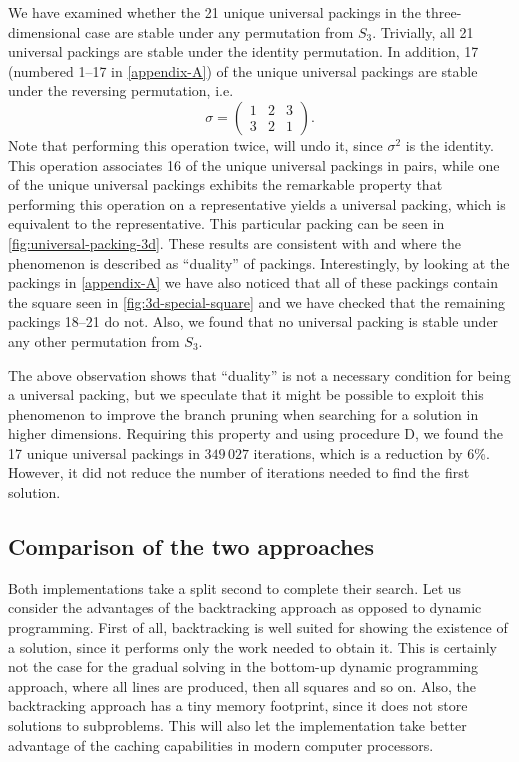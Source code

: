 \begin{observation}
We have examined whether the 21 unique universal packings in the three-dimensional case are stable under any permutation from $S_3$. Trivially, all 21 universal packings are stable under the identity permutation. In addition, 17 (numbered 1--17 in \cref{appendix-A}) of the unique universal packings are stable under the reversing permutation, i.e.
\[
\sigma =
\begin{pmatrix}
  1 & 2 & 3 \\
  3 & 2 & 1
\end{pmatrix}.
\]
Note that performing this operation twice, will undo it, since $\sigma^2$ is the identity. This operation associates 16 of the unique universal packings in pairs, while one of the unique universal packings exhibits the remarkable property that performing this operation on a representative yields a universal packing, which is equivalent to the representative. This particular packing can be seen in \cref{fig:universal-packing-3d}. These results are consistent with \cite[p. 5]{Spiridonov_2003} and \cite[p. 914]{berlekamp_conway_guy_2004} where the phenomenon is described as ``duality'' of packings. Interestingly, by looking at the packings in \cref{appendix-A} we have also noticed that all of these packings contain the square seen in \cref{fig:3d-special-square} and we have checked that the remaining packings 18--21 do not. Also, we found that no universal packing is stable under any other permutation from $S_3$.
\end{observation}

\noindent The above observation shows that ``duality'' is not a necessary condition for being a universal packing, but we speculate that it might be possible to exploit this phenomenon to improve the branch pruning when searching for a solution in higher dimensions. Requiring this property and using procedure D, we found the 17 unique universal packings in $349\,027$ iterations, which is a reduction by 6\%. However, it did not reduce the number of iterations needed to find the first solution.

\subsection{Comparison of the two approaches}
Both implementations take a split second to complete their search. Let us consider the advantages of the backtracking approach as opposed to dynamic programming. First of all, backtracking is well suited for showing the existence of a solution, since it performs only the work needed to obtain it. This is certainly not the case for the gradual solving in the bottom-up dynamic programming approach, where all lines are produced, then all squares and so on. Also, the backtracking approach has a tiny memory footprint, since it does not store solutions to subproblems. This will also let the implementation take better advantage of the caching capabilities in modern computer processors.

